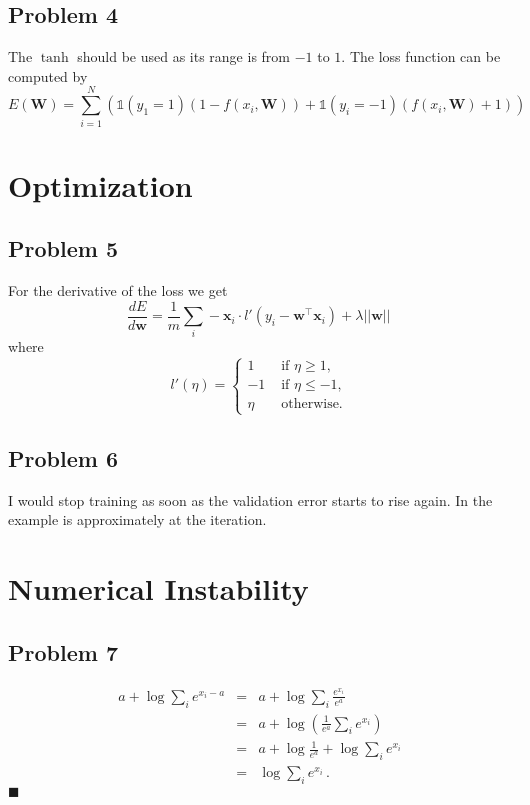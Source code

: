 \documentclass{scrartcl}
\newcommand{\qed}{\hfill $\blacksquare$}
\begin{document}
\subsection{Problem 4}
The $\tanh$ should be used as its range is from $-1$ to $1$. 
The loss function can be computed by
\begin{equation}
	E(\mathbf{W}) = \sum_{i=1}^{N}\left(\mathds{1}(y_1 = 1) (1 - f(x_i, \mathbf{W})) + \mathds{1}(y_i = -1) (f(x_i, \mathbf{W}) + 1)\right)
\end{equation}

\section{Optimization}
\subsection{Problem 5}
For the derivative of the loss we get
\begin{equation}
	\frac{dE}{d \mathbf{w}} = \frac{1}{m} \sum_i -\mathbf{x}_i \cdot l'(y_i - \mathbf{w}^\top \mathbf{x}_i) + \lambda ||\mathbf{w}|| \, 
\end{equation}
where
\begin{equation}
	l'(\eta) = \begin{cases}
		1 & \text{ if } \eta \ge 1, \\
		-1 & \text{ if } \eta \le -1,\\
		\eta & \text{ otherwise.}
	\end{cases}
\end{equation}

\subsection{Problem 6}
I would stop training as soon as the validation error starts to rise again. In the example is approximately at the  iteration.

\section{Numerical Instability}
\subsection{Problem 7}
\begin{eqnarray}
a + \log \sum_i e^{x_i - a} &=& a + \log \sum_i \frac{e^{x_i}}{e^a}\\
&=& a + \log \left(\frac{1}{e^a} \sum_i e^{x_i}\right)\\
&=& a + \log \frac{1}{e^a} + \log \sum_i e^{x_i}\\
&=& \log \sum_i e^{x_i}\, .
\end{eqnarray}
\qed
\end{document}
